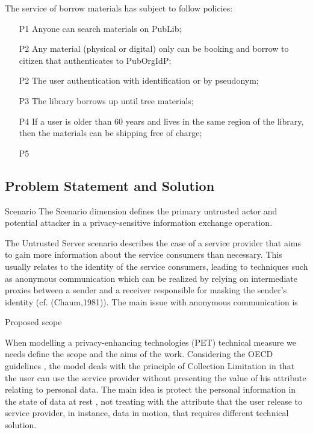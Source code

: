 \documentclass{doublecol-new}
\begin{document}
The service of borrow materials has subject to follow policies:
\begin{enumerate}
	\item [P1] Anyone can search materials on PubLib;	
	\item [P2] Any material (physical or digital) only can be booking and borrow to citizen that authenticates to PubOrgIdP;
	\item [P2] The user  authentication with identification or by pseudonym;
	\item [P3] The library borrows up until tree materials;
	\item [P4] If a user is older than 60 years and lives in the same region of the library, then the materials can be shipping free of charge;
	\item [P5] 
\end{enumerate}



\subsection[sec:problemstatement]{Problem Statement and Solution}

Scenario The Scenario dimension defines the primary untrusted actor and potential attacker in a privacy-sensitive information exchange operation.

The Untrusted Server scenario describes the case of a service provider that aims to gain more information about the service
consumers than necessary. This usually relates to the identity of the service consumers, leading to techniques such as
anonymous communication which can be realized by relying on intermediate proxies between a sender and a receiver
responsible for masking the sender's identity (cf. (Chaum,1981)). The main issue with anonymous communication is

Proposed scope

When modelling a privacy-enhancing technologies (PET) technical measure we needs define the scope and the aims of the work. Considering the OECD guidelines \citep{oecd2013guidelinesupdated}, the model deals with the principle of Collection Limitation in that the user can use the service provider without presenting the value of his attribute relating to personal data. The main idea is protect the personal information in the state of data at rest \citep{liu2010data}, not treating with the attribute that the user release to service provider, in instance, data in motion, that requires different technical solution. 
\end{document}
